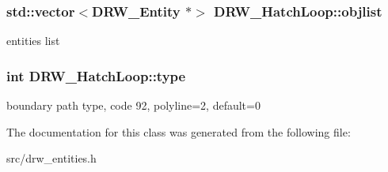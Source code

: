 \subsubsection[{objlist}]{\setlength{\rightskip}{0pt plus 5cm}std\+::vector$<${\bf D\+R\+W\+\_\+\+Entity} $\ast$$>$ D\+R\+W\+\_\+\+Hatch\+Loop\+::objlist}\label{class_d_r_w___hatch_loop_afbd7d0876386234348fa0a301051d601}
entities list \hypertarget{class_d_r_w___hatch_loop_a5891fcfa111b70221bc04c629bd6286d}{}
\subsubsection[{type}]{\setlength{\rightskip}{0pt plus 5cm}int D\+R\+W\+\_\+\+Hatch\+Loop\+::type}\label{class_d_r_w___hatch_loop_a5891fcfa111b70221bc04c629bd6286d}
boundary path type, code 92, polyline=2, default=0 

The documentation for this class was generated from the following file\+:\begin{DoxyCompactItemize}
\item 
src/drw\+\_\+entities.\+h\end{DoxyCompactItemize}
